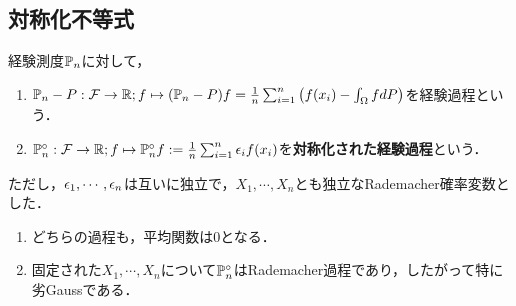 \documentclass[uplatex,dvipdfmx]{jsreport}
\begin{document}
\subsection{対称化不等式}

\begin{definition}
    経験測度$\mathbb{P}_n$に対して，
    \begin{enumerate}
        \item $\mathbb{P}_n-P:\mathcal{F}\to\mathbb{R};f\mapsto (\mathbb{P}_n-P)f=\frac{1}{n}\sum^n_{i=1}\left(f(x_i)-\int_\Omega fdP\right)$を経験過程という．
        \item $\mathbb{P}_n^\circ:\mathcal{F}\to\mathbb{R};f\mapsto\mathbb{P}_n^\circ f:=\frac{1}{n}\sum^n_{i=1}\epsilon_if(x_i)$を\textbf{対称化された経験過程}という．
    \end{enumerate}
    ただし，$\epsilon_1,\cdots,\epsilon_n$は互いに独立で，$X_1,\cdots,X_n$とも独立なRademacher確率変数とした．
\end{definition}

\begin{lemma}\mbox{}
    \begin{enumerate}
        \item どちらの過程も，平均関数は$0$となる．
        \item 固定された$X_1,\cdots,X_n$について$\mathbb{P}_n^\circ$はRademacher過程であり，したがって特に劣Gaussである．
    \end{enumerate}
\end{lemma}
\end{document}
